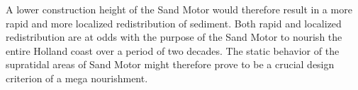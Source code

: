 A lower construction height of the Sand Motor would therefore result
in a more rapid and more localized redistribution of sediment. Both
rapid and localized redistribution are at odds with the purpose of the
Sand Motor to nourish the entire Holland coast over a period of two
decades. The static behavior of the supratidal areas of Sand Motor
might therefore prove to be a crucial design criterion of a mega
nourishment.

%
%

